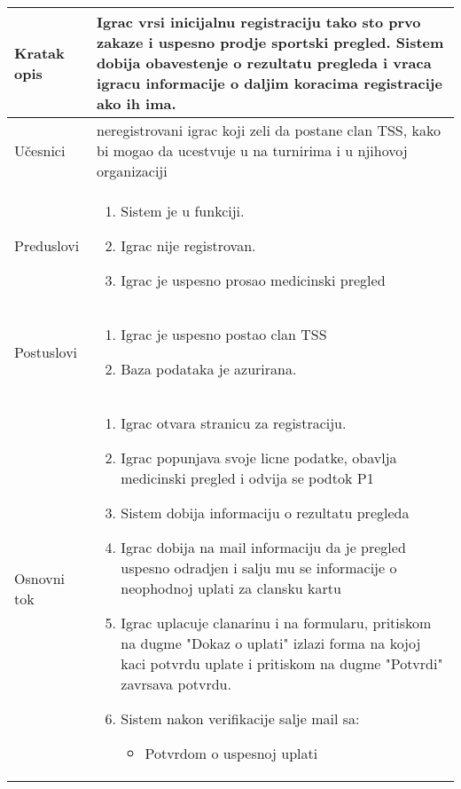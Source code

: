 \documentclass{article}
\begin{document}

\begin{longtable}{| p{} | p{} |} 
\hline
    Kratak opis & Igrac vrsi inicijalnu registraciju tako sto prvo zakaze i uspesno prodje sportski pregled. Sistem dobija obavestenje o rezultatu pregleda i vraca igracu informacije o daljim koracima registracije ako ih ima.\\ 
\hline    
    Učesnici & 
         neregistrovani igrac koji zeli da postane clan TSS, kako bi mogao da ucestvuje u na turnirima i u njihovoj organizaciji
    \\
\hline
   Preduslovi & \begin{enumerate}
       \item Sistem je u funkciji.
       \item Igrac nije registrovan.
       \item Igrac je uspesno prosao medicinski pregled
   \end{enumerate}\\
\hline  
    Postuslovi & \begin{enumerate}
        \item Igrac je uspesno postao clan TSS
        \item Baza podataka je azurirana.
    \end{enumerate}\\
\hline
    Osnovni tok & \begin{enumerate}
        \item Igrac otvara stranicu za registraciju.
        \item Igrac popunjava svoje licne podatke, obavlja medicinski pregled i odvija se podtok P1
        \item Sistem dobija informaciju o rezultatu pregleda
        \item Igrac dobija na mail informaciju da je pregled uspesno odradjen i salju mu se informacije o neophodnoj uplati za clansku kartu
        \item Igrac uplacuje clanarinu i na formularu, pritiskom na dugme "Dokaz o uplati" izlazi forma na kojoj kaci potvrdu uplate i pritiskom na dugme "Potvrdi" zavrsava potvrdu.
        \item Sistem nakon verifikacije salje mail sa:
        \begin{itemize}
            \item Potvrdom o uspesnoj uplati

\end{itemize}
\end{enumerate}
\end{longtable}
\end{document}
